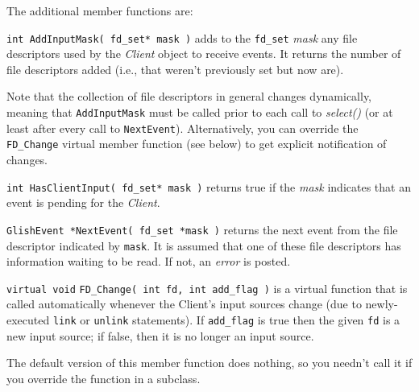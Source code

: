 The additional member functions are:
\begin{sloppy}
\begin{list}{}{}

\item[{\tt int AddInputMask( fd\_set* mask )}] adds
to the {\tt fd\_set} {\em mask} any file descriptors used by the {\em
Client} object to receive events.  It returns the number of file descriptors
added (i.e., that weren't previously set but now are).

Note that the collection of file descriptors in general changes dynamically,
meaning that {\tt AddInputMask} must be called prior to each call to
{\em select()} (or at least after every call to {\tt NextEvent}).
Alternatively, you can override the {\tt FD\_Change} virtual member function
(see below) to get explicit notification of changes.

\item[{\tt int HasClientInput( fd\_set* mask )}] returns
true if the
{\em mask} indicates that an event is pending for the {\em Client\/}.

\item[{\tt GlishEvent *NextEvent( fd\_set *mask )}]
returns the next event
from the file descriptor indicated by {\tt mask}. It is assumed
that one of these file descriptors has information waiting to be read. If not,
an {\em error} is posted.

\item[{\tt virtual void}] {\tt FD\_Change( int fd, int add\_flag )}
is a virtual function that is called automatically whenever the Client's
input sources change (due to newly-executed {\tt link} or {\tt unlink}
statements).  If {\tt add\_flag} is true then the given {\tt fd} is
a new input source; if false, then it is no longer an input source.

The default version of this member function does nothing, so you
needn't call it if you override the function in a subclass.

\end{list}
\end{sloppy}

